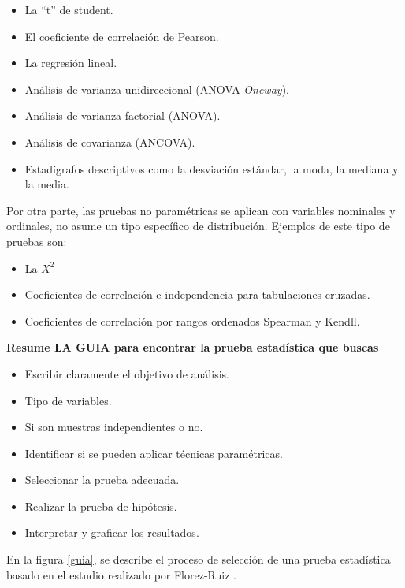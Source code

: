 \documentclass{article}
\begin{document}
\begin{itemize}
    \item La “t” de student.
    \item El coeficiente de correlación de Pearson.
    \item La regresión lineal.
    \item Análisis de varianza unidireccional (ANOVA \textit{Oneway}).
    \item Análisis de varianza factorial (ANOVA).
    \item Análisis de covarianza (ANCOVA).
    \item Estadígrafos descriptivos como la desviación estándar, la moda, la mediana y la media.
\end{itemize}

Por otra parte, las pruebas no paramétricas se aplican con variables nominales y ordinales, no asume un tipo específico de distribución. Ejemplos de este tipo de pruebas son:
    
\begin{itemize}
\item La $X^2$
\item Coeficientes de correlación e independencia para tabulaciones cruzadas.
\item Coeficientes de correlación por rangos ordenados Spearman y Kendll.
\end{itemize}
    
\noindent \textbf{Resume LA GUIA para encontrar la prueba estadística que buscas} 
    
\begin{itemize}
    \item Escribir claramente el objetivo de análisis.
    \item Tipo de variables.
    \item Si son muestras independientes o no.
    \item Identificar si se pueden aplicar técnicas paramétricas.
    \item Seleccionar la prueba adecuada.
    \item Realizar la prueba de hipótesis.
    \item Interpretar y graficar los resultados.
\end{itemize}
    
En la figura \ref{guia}, se describe el proceso de selección de una prueba estadística basado en el estudio realizado por Florez-Ruiz \cite{guia}.
    
\end{document}
